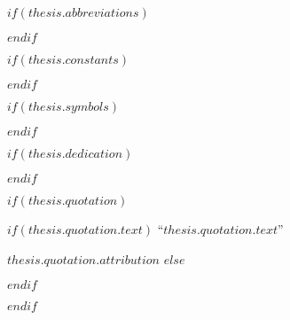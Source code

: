 $if(thesis.abbreviations)$



$endif$

$if(thesis.constants)$



$endif$

$if(thesis.symbols)$



$endif$

$if(thesis.dedication)$

\dedicatory{} 

$endif$

$if(thesis.quotation)$
\vspace*{0.2\textheight}

$if(thesis.quotation.text)$
\noindent``{\itshape $thesis.quotation.text$}''\bigbreak

\hfill $thesis.quotation.attribution$
$else$

$endif$

$endif$



\pagestyle{plain} %
